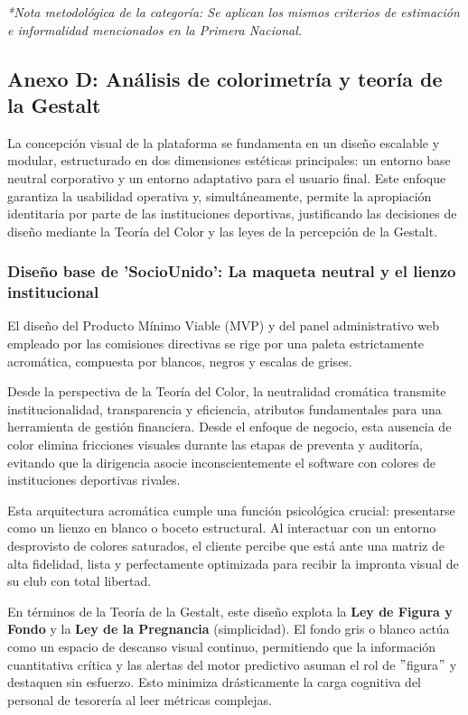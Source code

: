 \textit{*Nota metodológica de la categoría: Se aplican los mismos criterios de estimación e informalidad mencionados en la Primera Nacional.}

\newpage

\subsection{Anexo D: Análisis de colorimetría y teoría de la Gestalt}

La concepción visual de la plataforma se fundamenta en un diseño escalable y modular, estructurado en dos dimensiones estéticas principales: un entorno base neutral corporativo y un entorno adaptativo para el usuario final. Este enfoque garantiza la usabilidad operativa y, simultáneamente, permite la apropiación identitaria por parte de las instituciones deportivas, justificando las decisiones de diseño mediante la Teoría del Color y las leyes de la percepción de la Gestalt.

\subsubsection{Diseño base de 'SocioUnido': La maqueta neutral y el lienzo institucional}

El diseño del Producto Mínimo Viable (MVP) y del panel administrativo web empleado por las comisiones directivas se rige por una paleta estrictamente acromática, compuesta por blancos, negros y escalas de grises.

Desde la perspectiva de la Teoría del Color, la neutralidad cromática transmite institucionalidad, transparencia y eficiencia, atributos fundamentales para una herramienta de gestión financiera. Desde el enfoque de negocio, esta ausencia de color elimina fricciones visuales durante las etapas de preventa y auditoría, evitando que la dirigencia asocie inconscientemente el software con colores de instituciones deportivas rivales.

Esta arquitectura acromática cumple una función psicológica crucial: presentarse como un lienzo en blanco o boceto estructural. Al interactuar con un entorno desprovisto de colores saturados, el cliente percibe que está ante una matriz de alta fidelidad, lista y perfectamente optimizada para recibir la impronta visual de su club con total libertad.

En términos de la Teoría de la Gestalt, este diseño explota la \textbf{Ley de Figura y Fondo} y la \textbf{Ley de la Pregnancia} (simplicidad). El fondo gris o blanco actúa como un espacio de descanso visual continuo, permitiendo que la información cuantitativa crítica y las alertas del motor predictivo asuman el rol de $"$figura$"$ y destaquen sin esfuerzo. Esto minimiza drásticamente la carga cognitiva del personal de tesorería al leer métricas complejas.


